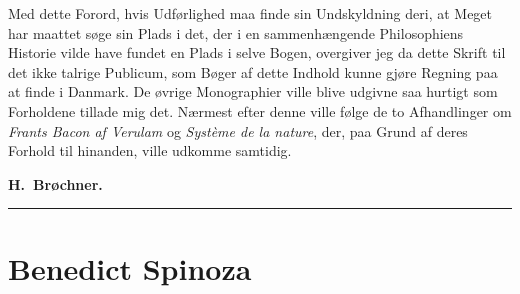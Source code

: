 \documentclass[12pt,a4paper]{book}
\newcommand{\opage}[1]{\marginnote{\footnotesize\textit{[#1]}}}
\begin{document}
Med dette Forord, hvis Udførlighed maa finde sin Undskyldning deri, at
Meget har maattet søge sin Plads i det, der i en sammenhængende
Philosophiens Historie vilde have fundet en Plads i selve Bogen,
overgiver jeg da dette Skrift til det ikke talrige Publicum, som Bøger
af dette Indhold kunne gjøre Regning paa at finde i Danmark. De øvrige
Monographier ville blive udgivne saa hurtigt som Forholdene tillade
mig det. Nærmest efter denne ville følge de to Afhandlinger om
\emph{Frants Bacon af Verulam} og \emph{Système de la nature}, der,
paa Grund af deres Forhold til hinanden, ville udkomme samtidig.

\bigskip
\begin{flushleft}
\end{flushleft}

\begin{flushright}
{\small\textbf{H.\ Brøchner.}}\hspace{4em}
\end{flushright}

\bigskip
\begin{center}\rule{2.5cm}{0.4pt}\end{center}

\newpage

\opage{15} \chapter*{Benedict Spinoza}
\end{document}
